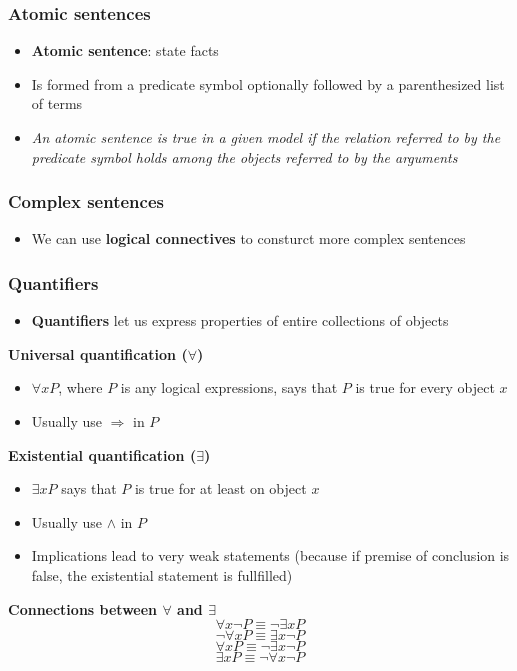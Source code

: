 \documentclass{scrartcl}
\begin{document}
\subsubsection{Atomic sentences}
\begin{itemize}
    \item
        \textbf{Atomic sentence}: state facts
    \item
        Is formed from a predicate symbol optionally followed by a parenthesized list of terms
    \item
        \textit{An atomic sentence is true in a given model if the relation referred to by the predicate symbol holds among the objects referred to by the arguments}
\end{itemize}

\subsubsection{Complex sentences}
\begin{itemize}
    \item
        We can use \textbf{logical connectives} to consturct more complex sentences
\end{itemize}

\subsubsection{Quantifiers}
\begin{itemize}
    \item
        \textbf{Quantifiers} let us express properties of entire collections of objects 
\end{itemize}
\textbf{Universal quantification ($\forall$)}
\begin{itemize}
    \item
        $\forall x P$, where $P$ is any logical expressions, says that $P$ is true for every object $x$
    \item
        Usually use $\Rightarrow$ in $P$
\end{itemize}
\textbf{Existential quantification ($\exists$)}
\begin{itemize}
    \item
        $\exists x P$ says that $P$ is true for at least on object $x$
    \item
        Usually use $\land$ in $P$
    \item
        Implications lead to very weak statements (because if premise of conclusion is false, the existential statement is fullfilled)
\end{itemize}
\textbf{Connections between $\forall$ and $\exists$}
$$\forall x \lnot P \equiv \lnot \exists x P$$
$$\lnot \forall x P \equiv \exists x \lnot P$$
$$\forall x P \equiv \lnot \exists x \lnot P$$
$$\exists x P \equiv \lnot \forall x \lnot P$$
\end{document}
